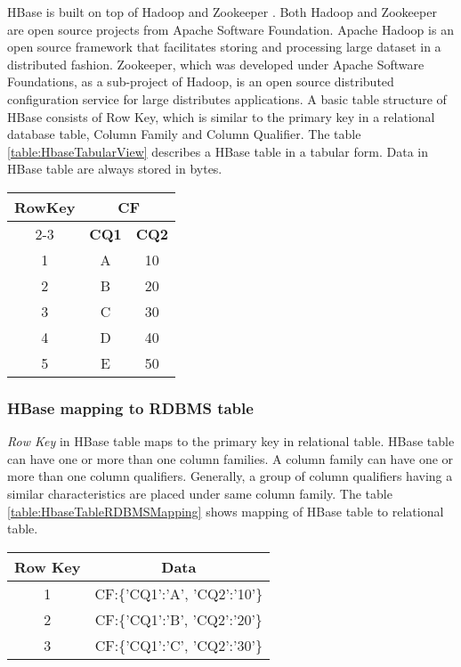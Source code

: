 \documentclass[11pt,a4paper,bibtotoc,idxtotoc,headsepline,footsepline,footexclude,BCOR12mm,DIV13]{scrbook}
\begin{document}
HBase is built on top of Hadoop and Zookeeper \cite{coprocessor:detail}. Both Hadoop and Zookeeper are open source projects from Apache Software Foundation. Apache Hadoop is an open source framework that facilitates storing and processing large dataset in a distributed fashion. Zookeeper, which was developed under Apache Software Foundations, as a sub-project of Hadoop, is an open source distributed configuration service for large distributes applications. A basic table structure of HBase consists of Row Key, which is similar to the primary key in a relational database table, Column Family and Column Qualifier. The table \ref{table:HbaseTabularView} describes a HBase table in a tabular form. Data in HBase table are always stored in bytes.\newline \newline 



\begin{table*}[htb!]
\centering
\begin{tabular}{|c|c|c|}
\hline
\multirow{2}{*}{\textbf{RowKey}} & \multicolumn{2}{c|}{\textbf{CF}}\\
\cline{2-3}
& \textbf{CQ1} & \textbf{CQ2}\\
\hline
1 & A & 10\\
2 & B & 20\\
3 & C & 30\\
4 & D & 40\\
5 & E & 50\\
\hline
\end{tabular}
\caption{HBase Table in Tabular view}
\label{table:HbaseTabularView}
\end{table*}
\subsubsection{HBase mapping to RDBMS table}
\emph{Row Key} in HBase table maps to the primary key in relational table. HBase table can have one or more than one column families. A column family can have one or more than one column qualifiers. Generally, a group of column qualifiers having a similar characteristics are placed under same column family. The table \ref{table:HbaseTableRDBMSMapping} shows mapping of HBase table to relational table.

\begin{table*}[htb!]
\centering
\begin{tabular}{|c|c|}
\hline
\textbf{Row Key} & \textbf{Data}\\
\hline
1 & CF:\{'CQ1':'A', 'CQ2':'10'\}\\
2 & CF:\{'CQ1':'B', 'CQ2':'20'\}\\
3 & CF:\{'CQ1':'C', 'CQ2':'30'\}\\
\hline
\end{tabular}
\caption{HBase Table mapping to RDBMS Table}
\label{table:HbaseTableRDBMSMapping}
\end{table*}
\end{document}
